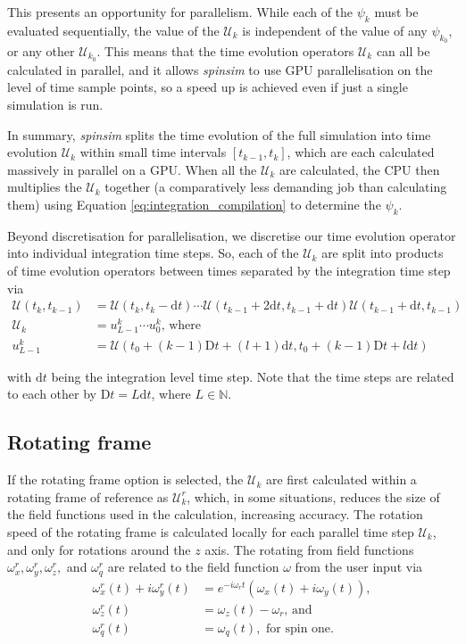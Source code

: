 \documentclass{jors}
\begin{document}
		This presents an opportunity for parallelism.
		While each of the \(\psi_k\) must be evaluated sequentially, the value of the \(\mathcal{U}_k\) is independent of the value of any \(\psi_{k_0}\), or any other \(\mathcal{U}_{k_0}\).
		This means that the time evolution operators \(\mathcal{U}_k\) can all be calculated in parallel, and it allows \emph{spinsim} to use GPU parallelisation on the level of time sample points, so a speed up is achieved even if just a single simulation is run.

		In summary, \emph{spinsim} splits the time evolution of the full simulation into time evolution \(\mathcal{U}_k\) within small time intervals \([t_{k - 1}, t_{k}]\), which are each calculated massively in parallel on a GPU.
		When all the \(\mathcal{U}_k\) are calculated, the CPU then multiplies the \(\mathcal{U}_k\) together (a comparatively less demanding job than calculating them) using Equation \eqref{eq:integration_compilation} to determine the \(\psi_k\).

		Beyond discretisation for parallelisation, we discretise our time evolution operator into individual integration time steps.
		So, each of the \(\mathcal{U}_k\) are split into products of time evolution operators between times separated by the integration time step via
		\begin{align}
			\mathcal{U}(t_k, t_{k-1}) &= \mathcal{U}(t_k, t_k - \mathrm{d}t) \cdots \mathcal{U}(t_{k-1} + 2\mathrm{d}t, t_{k-1} + \mathrm{d}t) \mathcal{U}(t_{k-1} + \mathrm{d}t, t_{k-1})\\
			\mathcal{U}_k &= u^k_{L-1} \cdots u^k_0\textrm{, where}\\
			u^k_{L-1} &= \mathcal{U}(t_0 + (k - 1)\mathrm{D}t + (l + 1)\mathrm{d}t, t_0 + (k - 1)\mathrm{D}t + l\mathrm{d}t)
		\end{align}

		with \(\mathrm{d}t\) being the integration level time step.
		Note that the time steps are related to each other by \(\mathrm{D}t = L\mathrm{d}t\), where \(L\in\mathbb{N}\).

	\subsection{Rotating frame}
		If the rotating frame option is selected, the \(\mathcal{U}_k\) are first calculated within a rotating frame of reference as \(\mathcal{U}^r_k\), which, in some situations, reduces the size of the field functions used in the calculation, increasing accuracy.
		The rotation speed of the rotating frame is calculated locally for each parallel time step \(\mathcal{U}_k\), and only for rotations around the \(z\) axis.
		The rotating from field functions \(\omega^r_x, \omega^r_y, \omega^r_z,\) and \(\omega^r_q\) are related to the field function \(\omega\) from the user input via
		\begin{align}
			\omega^r_x(t) + i\omega^r_y(t) &= e^{-i \omega_r t}(\omega_x(t) + i\omega_y(t)),\\
			\omega^r_z(t) &= \omega_z(t) - \omega_r\textrm{, and}\\
			\omega^r_q(t) &= \omega_q(t), \textrm{ for spin one.}
		\end{align}
		
\end{document}
